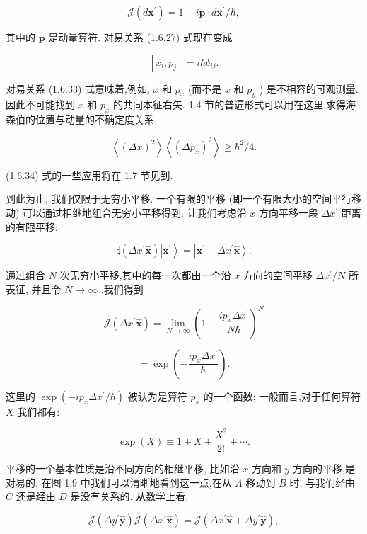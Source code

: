 \documentclass[lang=cn,newtx,10pt,scheme=chinese,thmcnt=section]{elegantbook}
\begin{document}
$$
\mathcal{J}\left( {d{\mathbf{x}}^{\prime }}\right) = 1 - i\mathbf{p} \cdot d{\mathbf{x}}^{\prime }/\hbar , \tag{1.6.32}
$$

其中的 $\mathbf{p}$ 是动量算符. 对易关系 (1.6.27) 式现在变成

$$
\left\lbrack {{x}_{i},{p}_{j}}\right\rbrack = i\hbar {\delta }_{ij}. \tag{1.6.33}
$$

对易关系 (1.6.33) 式意味着,例如, $x$ 和 ${p}_{x}$ (而不是 $x$ 和 ${p}_{y}$ ) 是不相容的可观测量. 因此不可能找到 $x$ 和 ${p}_{x}$ 的共同本征右矢. 1.4 节的普遍形式可以用在这里,求得海森伯的位置与动量的不确定度关系

$$
\left\langle {\left( \Delta x\right) }^{2}\right\rangle \left\langle {\left( \Delta {p}_{x}\right) }^{2}\right\rangle \geq {\hbar }^{2}/4. \tag{1. 6.34}
$$

(1.6.34) 式的一些应用将在 1.7 节见到.

到此为止, 我们仅限于无穷小平移. 一个有限的平移 (即一个有限大小的空间平行移动) 可以通过相继地组合无穷小平移得到. 让我们考虑沿 $x$ 方向平移一段 $\Delta {x}^{\prime }$ 距离的有限平移:

$$
\sharp \left( {\Delta {x}^{\prime }\widehat{\mathbf{x}}}\right) \left| {\mathbf{x}}^{\prime }\right\rangle = \left| {{\mathbf{x}}^{\prime } + \Delta {x}^{\prime }\widehat{\mathbf{x}}}\right\rangle . \tag{1.6.35}
$$

通过组合 $N$ 次无穷小平移,其中的每一次都由一个沿 $x$ 方向的空间平移 $\Delta {x}^{\prime }/N$ 所表征, 并且令 $N \rightarrow \infty$ ,我们得到

$$
\mathcal{J}\left( {\Delta {x}^{\prime }\widehat{\mathbf{x}}}\right) = \mathop{\lim }\limits_{{N \rightarrow \infty }}{\left( 1 - \frac{i{p}_{x}\Delta {x}^{\prime }}{N\hbar }\right) }^{N} \tag{1.6.36}
$$

$$
= \exp \left( {-\frac{i{p}_{x}\Delta {x}^{\prime }}{\hbar }}\right) .
$$

这里的 $\exp \left( {-i{p}_{x}\Delta {x}^{\prime }/\hbar }\right)$ 被认为是算符 ${p}_{x}$ 的一个函数; 一般而言,对于任何算符 $X$ 我们都有:

$$
\exp \left( X\right) \equiv 1 + X + \frac{{X}^{2}}{2!} + \cdots . \tag{1.6.37}
$$

平移的一个基本性质是沿不同方向的相继平移, 比如沿 $x$ 方向和 $y$ 方向的平移,是对易的. 在图 1.9 中我们可以清晰地看到这一点,在从 $A$ 移动到 $B$ 时, 与我们经由 $C$ 还是经由 $D$ 是没有关系的. 从数学上看,

$$
\mathcal{J}\left( {\Delta {y}^{\prime }\widehat{\mathbf{y}}}\right) \mathcal{J}\left( {\Delta {x}^{\prime }\widehat{\mathbf{x}}}\right) = \mathcal{J}\left( {\Delta {x}^{\prime }\widehat{\mathbf{x}} + \Delta {y}^{\prime }\widehat{\mathbf{y}}}\right) ,
$$
\end{document}

